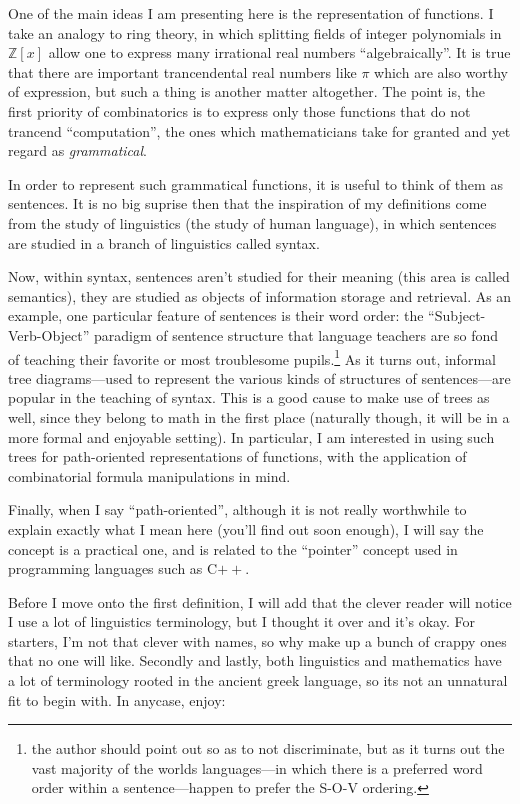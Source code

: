 \documentclass[twoside]{article}
\begin{document}
One of the main ideas I am presenting here is the representation of functions.  I take an analogy to ring theory,
in which splitting fields of integer polynomials in $ \mathbb{Z}[x] $ allow one to express many irrational real
numbers ``algebraically''.  It is true that there are important trancendental real numbers like $ \pi $ which are also
worthy of expression, but such a thing is another matter altogether.  The point is, the first priority of combinatorics
is to express only those functions that do not trancend ``computation'', the ones which mathematicians take for granted
and yet regard as \emph{grammatical}.

In order to represent such grammatical functions, it is useful to think of them as sentences.  It is no big suprise
then that the inspiration of my definitions come from the study of linguistics (the study of human language),
in which sentences are studied in a branch of linguistics called syntax.

Now, within syntax, sentences aren't studied for their meaning (this area is called semantics), they are studied as
objects of information storage and retrieval.  As an example, one particular feature of sentences is their word order:
the ``Subject-Verb-Object'' paradigm of sentence structure that language teachers are so fond of teaching their favorite
or most troublesome pupils.\footnote{the author should point out so as to not discriminate, but as it turns out the vast
majority of the worlds languages---in which there is a preferred word order within a sentence---happen to prefer the S-O-V
ordering.}  As it turns out, informal tree diagrams---used to represent the various kinds of structures of sentences---are
popular in the teaching of syntax.  This is a good cause to make use of trees as well, since they belong to math in the
first place (naturally though, it will be in a more formal and enjoyable setting).  In particular, I am interested in using
such trees for path-oriented representations of functions, with the application of combinatorial formula manipulations in
mind.

Finally, when I say ``path-oriented'', although it is not really worthwhile to explain exactly
what I mean here (you'll find out soon enough), I will say the concept is a practical one, and
is related to the ``pointer'' concept used in programming languages such as C$ ++ $.

Before I move onto the first definition, I will add that the clever reader will notice I use a lot of linguistics
terminology, but I thought it over and it's okay.  For starters, I'm not that clever with names, so why make up a bunch
of crappy ones that no one will like.  Secondly and lastly, both linguistics and mathematics have a lot of terminology
rooted in the ancient greek language, so its not an unnatural fit to begin with.  In anycase, enjoy:
\end{document}
